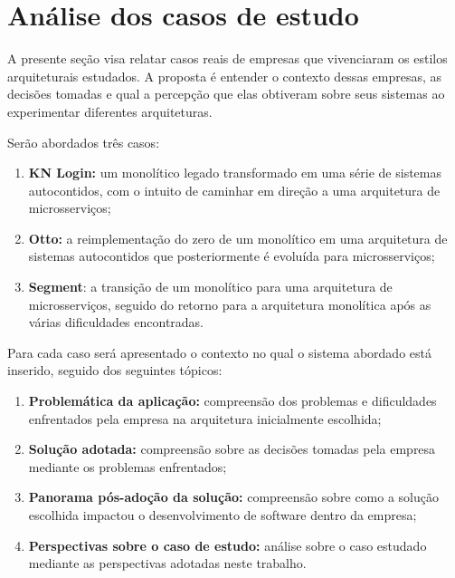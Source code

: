 
\section{Análise dos casos de estudo}

A presente seção visa relatar casos reais de empresas que vivenciaram os estilos arquiteturais
estudados. A proposta é entender o contexto dessas empresas, as decisões tomadas e qual a percepção
que elas obtiveram sobre seus sistemas ao experimentar diferentes arquiteturas.

Serão abordados três casos:

\begin{enumerate}
    \item \textbf{KN Login:} um monolítico legado transformado em uma série de sistemas autocontidos, com o
        intuito de caminhar em direção a uma arquitetura de microsserviços;
    \item \textbf{Otto:} a reimplementação do zero de um monolítico em uma arquitetura de sistemas
        autocontidos que posteriormente é evoluída para microsserviços;
    \item \textbf{Segment}: a transição de um monolítico para uma arquitetura de microsserviços,
        seguido do retorno para a arquitetura monolítica após as várias dificuldades encontradas.
\end{enumerate}

Para cada caso será apresentado o contexto no qual o sistema abordado está inserido, seguido dos
seguintes tópicos:

\begin{enumerate}
    \item \textbf{Problemática da aplicação:} compreensão dos problemas e dificuldades enfrentados
        pela empresa na arquitetura inicialmente escolhida;
    \item \textbf{Solução adotada:} compreensão sobre as decisões tomadas pela empresa mediante os
        problemas enfrentados;
    \item \textbf{Panorama pós-adoção da solução:} compreensão sobre como a solução escolhida
        impactou o desenvolvimento de software dentro da empresa;
    \item \textbf{Perspectivas sobre o caso de estudo:} análise sobre o caso estudado mediante as
        perspectivas adotadas neste trabalho.
\end{enumerate}

